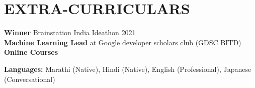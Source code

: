 \documentclass[letterpaper,11pt]{article}
\newcommand{\resumeSubHeadingListStart}{\begin{itemize}[leftmargin=0.15in, label={}]}
\newcommand{\resumeSubHeadingListEnd}{\end{itemize}}
\begin{document}
\section{EXTRA-CURRICULARS}
  \vspace{1pt}
  \resumeSubHeadingListStart
    \small{\item{
		    \textbf{Winner}{ Brainstation India Ideathon 2021 } \\ \vspace{2pt}
		    \textbf{Machine Learning Lead}{ at Google developer scholars club (GDSC BITD) } \\ \vspace{12pt}
		    \textbf{Online Courses}{}
		    \textbf{}{}
		    \textbf{}{}

        	    \textbf{}{}
                }


        \textbf{Languages:}{ Marathi (Native), Hindi (Native), English (Professional), Japanese (Conversational)}
        }
  \resumeSubHeadingListEnd
\end{document}
